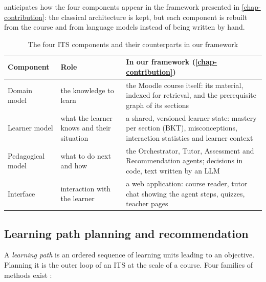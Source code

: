  anticipates how the four components appear in the
framework presented in \cref{chap-contribution}: the classical
architecture is kept, but each component is rebuilt from the course and
from language models instead of being written by hand.

\begin{table}[htbp]
\centering
\caption{The four ITS components and their counterparts in our framework}
\label{tab-its-mapping}
\small
\begin{tabularx}{\textwidth}{@{}L{2.6cm}YY@{}}
\toprule
\textbf{Component} & \textbf{Role} & \textbf{In our framework (\cref{chap-contribution})} \\
\midrule
Domain model & the knowledge to learn & the Moodle course itself: its material, indexed for retrieval, and the prerequisite graph of its sections \\
Learner model & what the learner knows and their situation & a shared, versioned learner state: mastery per section (BKT), misconceptions, interaction statistics and learner context \\
Pedagogical model & what to do next and how & the Orchestrator, Tutor, Assessment and Recommendation agents; decisions in code, text written by an LLM \\
Interface & interaction with the learner & a web application: course reader, tutor chat showing the agent steps, quizzes, teacher pages \\
\bottomrule
\end{tabularx}
\end{table}

\subsection{Learning path planning and recommendation}
\label{subsec-path}

A \emph{learning path} is an ordered sequence of learning units leading to
an objective. Planning it is the outer loop of an ITS at the scale of a
course. Four families of methods exist \cite{nabizadeh2020}:

